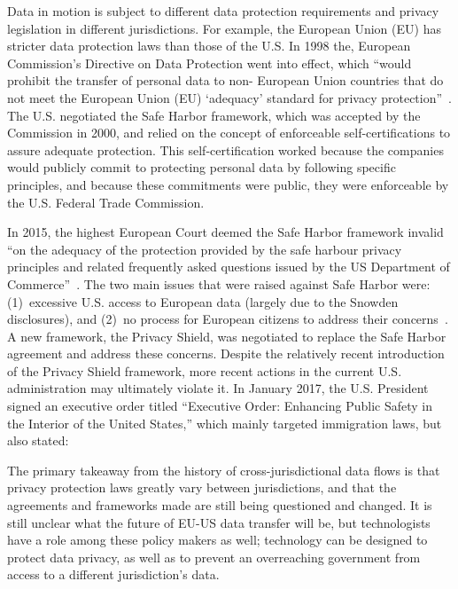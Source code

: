 Data in motion is subject to different data protection requirements and
privacy legislation in different jurisdictions.  For example, the European
Union (EU) has stricter data protection laws than those of the U.S.
In 1998 the, European Commission's Directive on Data Protection went
into effect, which ``would prohibit the transfer of personal data to non-
European Union countries that do not meet the European Union (EU) `adequacy'
standard for privacy protection''~\cite{safeharbor}.  The U.S. negotiated the
Safe Harbor framework, which was accepted by the Commission in 2000, and
relied on the concept of enforceable self-certifications to assure adequate
protection. This self-certification worked because the companies would
publicly commit to protecting personal data by following specific principles,
and because these commitments were public, they were enforceable by the
U.S. Federal Trade Commission.

In 2015, the highest European Court deemed the Safe Harbor framework invalid
``on the adequacy of the protection provided by the safe harbour privacy
principles and related frequently asked questions issued by the US Department
of Commerce''~\cite{safeharbor}.  The two main issues that were raised against
Safe Harbor were: (1)~excessive U.S. access to European data (largely due to
the Snowden disclosures), and (2)~no process for European citizens to address
their concerns~\cite{safeharbor_ps_diffs}.  A new framework, the Privacy
Shield, was negotiated to replace the Safe Harbor agreement and address these
concerns.  Despite the relatively recent introduction of the Privacy Shield
framework, more recent actions in the current U.S. administration may
ultimately violate it.  In January 2017, the U.S. President signed an
executive order titled ``Executive Order: Enhancing Public Safety in the
Interior of the United States,'' which mainly targeted immigration laws, but
also stated:


The primary takeaway from the history of cross-jurisdictional data flows is that privacy protection laws greatly vary between jurisdictions, and that the agreements and frameworks made are still being questioned and changed.  It is still unclear what the future of EU-US data transfer will be, but technologists have a role among these policy makers as well; technology can be designed to protect data privacy, as well as to prevent an overreaching government from access to a different jurisdiction's data.

